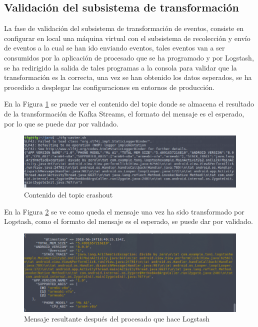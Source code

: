 \subsection{Validación del subsistema de transformación}
La fase de validación del subsistema de transformación de eventos, consiste en configurar en local una máquina virtual con el subsistema de recolección y envío de eventos a la cual se han ido enviando eventos, tales eventos van a ser consumidos por la aplicación de procesado que se ha programado y por Logstash, se ha redirigido la salida de tales programas a la consola para validar que la transformación es la correcta, una vez se han obtenido los datos esperados, se ha procedido a desplegar las configuraciones en entornos de producción.


En la Figura \ref{fig:crashout} se puede ver el contenido del topic donde se almacena el resultado de la transformación de Kafka Streams, el formato del mensaje es el esperado, por lo que se puede dar por validado.

\begin{figure}[!htb]
	\centering
	\includegraphics[scale=0.60, width=\linewidth] {crashout.png}
	\caption{Contenido del topic crashout}
	\label{fig:crashout}
\end{figure}

En la Figura \ref{fig:logstash} se ve como queda el mensaje una vez ha sido transformado por Logstash, como el formato del mensaje es el esperado, se puede dar por validado.

\begin{figure}[!htb]
	\centering
	\includegraphics[scale=0.60, width=\linewidth] {logstash.png}
	\caption{Mensaje resultante después del procesado que hace Logstash}
	\label{fig:logstash}
\end{figure}




